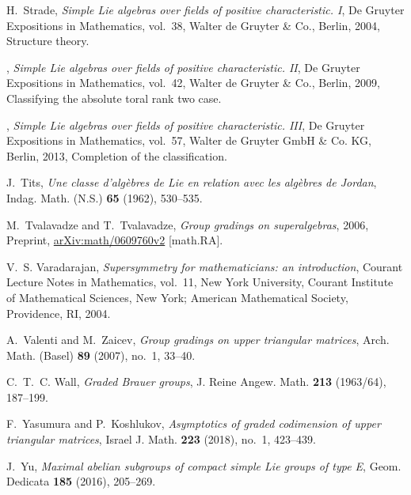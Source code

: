 \documentclass[12pt]{pdfathesis}
\begin{document}
\begin{thebibliography}{BHDSK17}
H.~Strade, \emph{Simple {L}ie algebras over fields of positive characteristic.
  {I}}, De Gruyter Expositions in Mathematics, vol.~38, Walter de Gruyter \&
  Co., Berlin, 2004, Structure theory. 

\bysame, \emph{Simple {L}ie algebras over fields of positive characteristic.
  {II}}, De Gruyter Expositions in Mathematics, vol.~42, Walter de Gruyter \&
  Co., Berlin, 2009, Classifying the absolute toral rank two case. 

\bysame, \emph{Simple {L}ie algebras over fields of positive characteristic.
  {III}}, De Gruyter Expositions in Mathematics, vol.~57, Walter de Gruyter
  GmbH \& Co. KG, Berlin, 2013, Completion of the classification. 

J.~Tits, \emph{Une classe d'alg\`ebres de {L}ie en relation avec les alg\`ebres
  de {J}ordan}, Indag. Math. (N.S.) \textbf{65} (1962), 530--535. 

M.~Tvalavadze and T.~Tvalavadze, \emph{Group gradings on superalgebras}, 2006,
  Preprint, \href{https://arxiv.org/abs/math/0609760v2}{arXiv:math/0609760v2}
  [math.RA].

V.~S. Varadarajan, \emph{Supersymmetry for mathematicians: an introduction},
  Courant Lecture Notes in Mathematics, vol.~11, New York University, Courant
  Institute of Mathematical Sciences, New York; American Mathematical Society,
  Providence, RI, 2004. 

A.~Valenti and M.~Zaicev, \emph{Group gradings on upper triangular matrices},
  Arch. Math. (Basel) \textbf{89} (2007), no.~1, 33--40. 

C.~T.~C. Wall, \emph{Graded {B}rauer groups}, J. Reine Angew. Math.
  \textbf{213} (1963/64), 187--199. 

F.~Yasumura and P.~Koshlukov, \emph{Asymptotics of graded codimension of upper
  triangular matrices}, Israel J. Math. \textbf{223} (2018), no.~1, 423--439.

J.~Yu, \emph{Maximal abelian subgroups of compact simple {L}ie groups of type
  {E}}, Geom. Dedicata \textbf{185} (2016), 205--269. 

\end{thebibliography}
\end{document}
